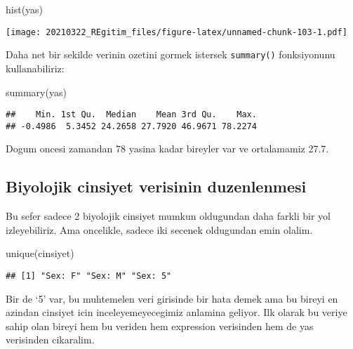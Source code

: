 \documentclass[
]{book}
\newenvironment{Shaded}{\begin{snugshade}}{\end{snugshade}}
\newcommand{\FunctionTok}[1]{\textcolor[rgb]{0.00,0.00,0.00}{#1}}
\newcommand{\NormalTok}[1]{#1}
\begin{document}
\begin{Shaded}
\begin{Highlighting}[]
\FunctionTok{hist}\NormalTok{(yas)}
\end{Highlighting}
\end{Shaded}

\texttt{[image: 20210322\_REgitim\_files/figure-latex/unnamed-chunk-103-1.pdf]}

Daha net bir sekilde verinin ozetini gormek istersek \texttt{summary()} fonksiyonunu kullanabiliriz:

\begin{Shaded}
\begin{Highlighting}[]
\FunctionTok{summary}\NormalTok{(yas)}
\end{Highlighting}
\end{Shaded}

\begin{verbatim}
##    Min. 1st Qu.  Median    Mean 3rd Qu.    Max. 
## -0.4986  5.3452 24.2658 27.7920 46.9671 78.2274
\end{verbatim}

Dogum oncesi zamandan 78 yasina kadar bireyler var ve ortalamamiz 27.7.

\hypertarget{biyolojik-cinsiyet-verisinin-duzenlenmesi}{%
\subsection{Biyolojik cinsiyet verisinin duzenlenmesi}\label{biyolojik-cinsiyet-verisinin-duzenlenmesi}}

Bu sefer sadece 2 biyolojik cinsiyet mumkun oldugundan daha farkli bir yol izleyebiliriz. Ama oncelikle, sadece iki secenek oldugundan emin olalim.

\begin{Shaded}
\begin{Highlighting}[]
\FunctionTok{unique}\NormalTok{(cinsiyet)}
\end{Highlighting}
\end{Shaded}

\begin{verbatim}
## [1] "Sex: F" "Sex: M" "Sex: 5"
\end{verbatim}

Bir de `5' var, bu muhtemelen veri girisinde bir hata demek ama bu bireyi en azindan cinsiyet icin inceleyemeyecegimiz anlamina geliyor. Ilk olarak bu veriye sahip olan bireyi hem bu veriden hem expression verisinden hem de yas verisinden cikaralim.
\end{document}
